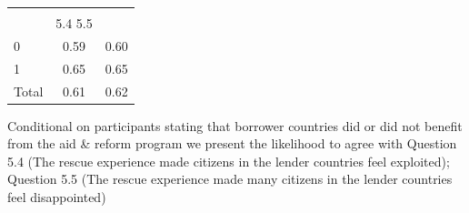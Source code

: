 \begin{table} 
  \begin{center}
\begin{tabular}{l*{1}{cc}}
\hline\hline
                    &\multicolumn{2}{c}{}     \\
                    &  5.4  5.5 \\
\hline
0                   &        0.59&        0.60\\
1                   &        0.65&        0.65\\
Total               &        0.61&        0.62\\
\hline\hline
\end{tabular}
\end{center} 
\begin{tablenotes}
\item \tiny Conditional on participants stating that borrower countries did or did not benefit from the aid & reform program we present the likelihood to agree with Question 5.4 (The rescue experience made citizens in the lender countries feel exploited); Question 5.5 (The rescue experience made many citizens in the lender countries feel disappointed)
\end{tablenotes}
\end{table}
\\

